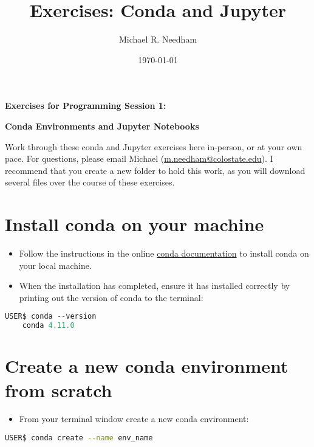 \documentclass[10pt]{article}
\title{Exercises: Conda and Jupyter}
\author{Michael R. Needham}
\date{\today}
\begin{document}
	
	\lhead{\theauthor}
	\rhead{\thetitle}
	
	\begin{center}
		\textbf{\LARGE Exercises for Programming Session 1: }
		
		\textbf{\LARGE Conda Environments and Jupyter Notebooks}		
	\end{center}

	
	\noindent
	Work through these conda and Jupyter exercises here in-person, or at your own pace. For questions, please email Michael (\href{mailto:m.needham@colostate.edu}{m.needham@colostate.edu}). I recommend that you create a new folder to hold this work, as you will download several files over the course of these exercises. 
		\section{Install conda on your machine}

\begin{itemize}
\item Follow the instructions in the online \href{https://conda.io/projects/conda/en/latest/user-guide/install/index.html}{conda documentation} to install conda on your local machine.
\item When the installation has completed, ensure it has installed correctly by printing out the version of conda to the terminal:
\end{itemize}		

		
\begin{lstlisting}[language=Python]
	USER$ conda --version
	conda 4.11.0
\end{lstlisting}
	

\section{Create a new conda environment from scratch}
\begin{itemize}
	\item From your terminal window create a new conda environment:
\end{itemize}
\begin{lstlisting}[language=bash]
	USER$ conda create --name env_name
\end{lstlisting}
\end{document}
